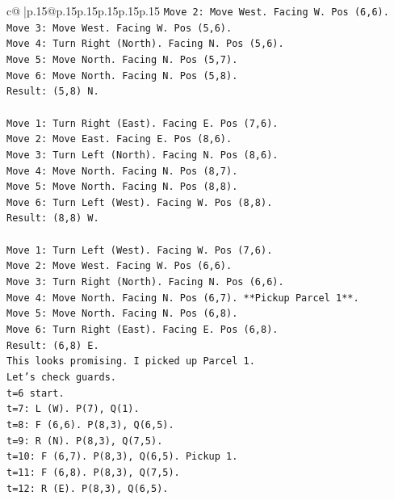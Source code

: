 \documentclass{article}
\begin{document}
{\begin{supertabular}{c@{$\;$}|p{.15\linewidth}@{}p{.15\linewidth}p{.15\linewidth}p{.15\linewidth}p{.15\linewidth}p{.15\linewidth}}
{{{\texttt{Move 2: Move West. Facing W. Pos (6,6).} \\
\texttt{Move 3: Move West. Facing W. Pos (5,6).} \\
\texttt{Move 4: Turn Right (North). Facing N. Pos (5,6).} \\
\texttt{Move 5: Move North. Facing N. Pos (5,7).} \\
\texttt{Move 6: Move North. Facing N. Pos (5,8).} \\
\texttt{Result: (5,8) N.} \\
\\ 
\texttt{Move 1: Turn Right (East). Facing E. Pos (7,6).} \\
\texttt{Move 2: Move East. Facing E. Pos (8,6).} \\
\texttt{Move 3: Turn Left (North). Facing N. Pos (8,6).} \\
\texttt{Move 4: Move North. Facing N. Pos (8,7).} \\
\texttt{Move 5: Move North. Facing N. Pos (8,8).} \\
\texttt{Move 6: Turn Left (West). Facing W. Pos (8,8).} \\
\texttt{Result: (8,8) W.} \\
\\ 
\texttt{Move 1: Turn Left (West). Facing W. Pos (7,6).} \\
\texttt{Move 2: Move West. Facing W. Pos (6,6).} \\
\texttt{Move 3: Turn Right (North). Facing N. Pos (6,6).} \\
\texttt{Move 4: Move North. Facing N. Pos (6,7). **Pickup Parcel 1**.} \\
\texttt{Move 5: Move North. Facing N. Pos (6,8).} \\
\texttt{Move 6: Turn Right (East). Facing E. Pos (6,8).} \\
\texttt{Result: (6,8) E.} \\
\texttt{This looks promising. I picked up Parcel 1.} \\
\texttt{Let's check guards.} \\
\texttt{t=6 start.} \\
\texttt{t=7: L (W). P(7), Q(1).} \\
\texttt{t=8: F (6,6). P(8,3), Q(6,5).} \\
\texttt{t=9: R (N). P(8,3), Q(7,5).} \\
\texttt{t=10: F (6,7). P(8,3), Q(6,5). Pickup 1.} \\
\texttt{t=11: F (6,8). P(8,3), Q(7,5).} \\
\texttt{t=12: R (E). P(8,3), Q(6,5).} \\
}}}
\end{supertabular}}
\end{document}
